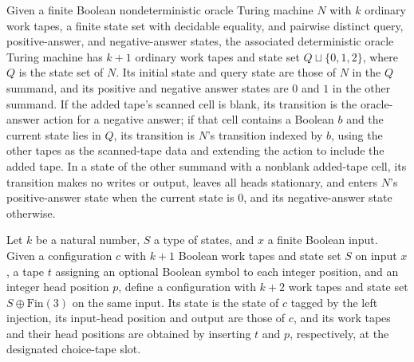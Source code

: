 \begin{definition}
\label{Turing.oracleChoiceMachine}
\leanok
{}
Given a finite Boolean nondeterministic oracle Turing machine $N$ with $k$ ordinary work
tapes, a finite state set with decidable equality, and pairwise distinct query,
positive-answer, and negative-answer states, the associated deterministic oracle Turing
machine has $k+1$ ordinary work tapes and state set $Q\sqcup\{0,1,2\}$, where $Q$ is the
state set of $N$. Its initial state and query state are those of $N$ in the $Q$ summand,
and its positive and negative answer states are $0$ and $1$ in the other summand. If the
added tape's scanned cell is blank, its transition is the oracle-answer action for a
negative answer; if that cell contains a Boolean $b$ and the current state lies in $Q$,
its transition is $N$'s transition indexed by $b$, using the other tapes as the
scanned-tape data and extending the action to include the added tape. In a state of the
other summand with a nonblank added-tape cell, its transition makes no writes or output,
leaves all heads stationary, and enters $N$'s positive-answer state when the current
state is $0$, and its negative-answer state otherwise.
\end{definition}

\begin{definition}
\label{Turing.oracleChoiceCfg}
\leanok
{}
Let $k$ be a natural number, $S$ a type of states, and $x$ a finite Boolean input. Given
a configuration $c$ with $k+1$ Boolean work tapes and state set $S$ on input $x$, a tape
$t$ assigning an optional Boolean symbol to each integer position, and an integer head
position $p$, define a configuration with $k+2$ work tapes and state set $S \oplus
\mathrm{Fin}(3)$ on the same input. Its state is the state of $c$ tagged by the left
injection, its input-head position and output are those of $c$, and its work tapes and
their head positions are obtained by inserting $t$ and $p$, respectively, at the
designated choice-tape slot.
\end{definition}

